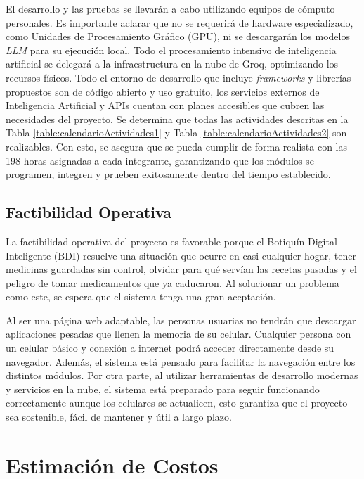 El desarrollo y las pruebas se llevarán a cabo utilizando equipos de cómputo personales. Es importante aclarar que no se requerirá de hardware especializado, como Unidades de Procesamiento Gráfico (GPU), ni se descargarán los modelos \emph{LLM} para su ejecución local. Todo el procesamiento intensivo de inteligencia artificial se delegará a la infraestructura en la nube de Groq, optimizando los recursos físicos. Todo el entorno de desarrollo que incluye \emph{frameworks} y librerías propuestos son de código abierto y uso gratuito, los servicios externos de Inteligencia Artificial y APIs cuentan con planes accesibles que cubren las necesidades del proyecto. Se determina que todas las actividades descritas en la Tabla \ref{table:calendarioActividades1} y Tabla \ref{table:calendarioActividades2} son realizables. Con esto, se asegura que se pueda cumplir de forma realista con las 198 horas asignadas a cada integrante, garantizando que los módulos se programen, integren y prueben exitosamente dentro del tiempo establecido.

\subsection{Factibilidad Operativa}
La factibilidad operativa del proyecto es favorable porque el Botiquín Digital Inteligente (BDI) resuelve una situación que ocurre en casi cualquier hogar, tener medicinas guardadas sin control, olvidar para qué servían las recetas pasadas y el peligro de tomar medicamentos que ya caducaron. Al solucionar un problema como este, se espera que el sistema tenga una gran aceptación.

Al ser una página web adaptable, las personas usuarias no tendrán que descargar aplicaciones pesadas que llenen la memoria de su celular. Cualquier persona con un celular básico y conexión a internet podrá acceder directamente desde su navegador. Además, el sistema está pensado para facilitar la navegación entre los distintos módulos. Por otra parte, al utilizar herramientas de desarrollo modernas y servicios en la nube, el sistema está preparado para seguir funcionando correctamente aunque los celulares se actualicen, esto garantiza que el proyecto sea sostenible, fácil de mantener y útil a largo plazo.

\section{Estimación de Costos}

